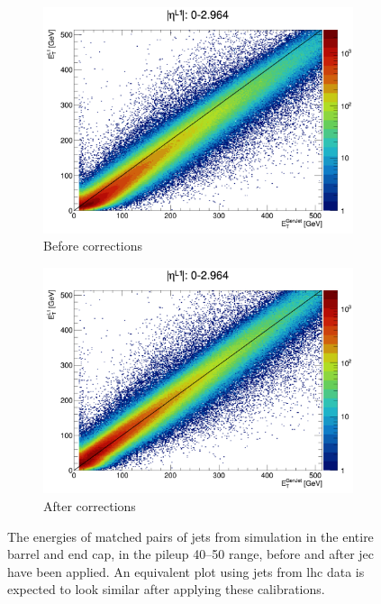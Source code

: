 \begin{figure}[htbp]
    \centering
    \begin{subfigure}[b]{0.48\textwidth}
        \includegraphics[width=\textwidth]{./figures/jecs/scatterPlotBeforeBE.pdf}
        \caption{Before corrections}
        \label{fig:detector_jecs_scatter_before_BE}
    \end{subfigure}
    \hfill
    \begin{subfigure}[b]{0.48\textwidth}
        \includegraphics[width=\textwidth]{./figures/jecs/scatterPlotAfterBE.pdf}
        \caption{After corrections}
        \label{fig:detector_jecs_scatter_after_BE}
    \end{subfigure}
\caption[The energies of matched pairs of jets from simulation in the entire barrel and end cap, in the pileup 40--50 range, before and after jet energy corrections have been applied]{The energies of matched pairs of \glspl{jet} from simulation in the entire barrel and end cap, in the \gls{pileup} 40--50 range, before and after \acrlong{jec} have been applied. An equivalent plot using \glspl{jet} from \acrshort{lhc} data is expected to look similar after applying these calibrations.}
\label{fig:detector_jecs_scatter_BE}
\end{figure}

